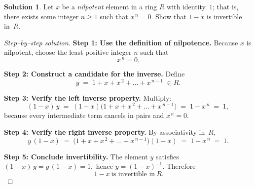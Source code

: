 \documentclass[12pt]{article}
\theoremstyle{definition} %
\newtheorem{solution}{Solution}
\theoremstyle{plain} %
\begin{document}
\begin{solution}
    Let $x$ be a \emph{nilpotent} element in a ring $R$ with identity~$1$; that is,
    there exists some integer $n\ge 1$ such that $x^{\,n}=0$.
    Show that $1-x$ is invertible in~$R$.
    
    \begin{proof}[Step–by–step solution]
    \textbf{Step 1:  Use the definition of nilpotence.}\newline
    Because $x$ is nilpotent, choose the least positive integer $n$ such that
    \[
      x^{\,n}=0.
    \]
    
    \bigskip
    \textbf{Step 2:  Construct a candidate for the inverse.}\newline
    Define
    \[
      y \;=\; 1 + x + x^{\,2} + \dots + x^{\,n-1}\;\in R.
    \]
    
    \bigskip
    \textbf{Step 3:  Verify the left inverse property.}\newline
    Multiply:
    \[
      (1 - x)\,y
      \;=\;
      (1 - x)\bigl(1 + x + x^{\,2} + \dots + x^{\,n-1}\bigr)
      \;=\;
      1 - x^{\,n}
      \;=\;
      1,
    \]
    because every intermediate term cancels in pairs and $x^{\,n}=0$.
    
    \bigskip
    \textbf{Step 4:  Verify the right inverse property.}\newline
    By associativity in~$R$,
    \[
      y\,(1 - x)
      \;=\;
      \bigl(1 + x + x^{\,2} + \dots + x^{\,n-1}\bigr)(1 - x)
      \;=\;
      1 - x^{\,n}
      \;=\;
      1.
    \]
    
    \bigskip
    \textbf{Step 5:  Conclude invertibility.}\newline
    The element $y$ satisfies
    \(
      (1-x)\,y = y\,(1-x) = 1,
    \)
    hence $y=(1-x)^{-1}$.
    Therefore
    \[
      \boxed{\,1 - x\ \text{is invertible in}\ R.}
    \]
    \end{proof}
\end{solution}
\end{document}
